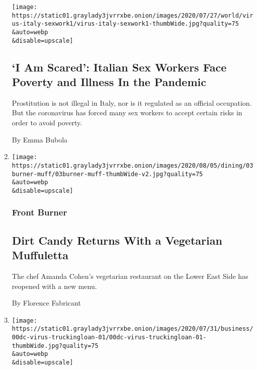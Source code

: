 \begin{enumerate}
  \texttt{[image: https://static01.graylady3jvrrxbe.onion/images/2020/07/27/world/virus-italy-sexwork1/virus-italy-sexwork1-thumbWide.jpg?quality=75\\\&auto=webp\\\&disable=upscale]}

  \hypertarget{i-am-scared-italian-sex-workers-face-poverty-and-illness-in-the-pandemic}{%
  \subsection{`I Am Scared': Italian Sex Workers Face Poverty and
  Illness In the
  Pandemic}\label{i-am-scared-italian-sex-workers-face-poverty-and-illness-in-the-pandemic}}

  Prostitution is not illegal in Italy, nor is it regulated as an
  official occupation. But the coronavirus has forced many sex workers
  to accept certain risks in order to avoid poverty.

  By Emma Bubola
\item
  \href{/2020/08/03/dining/dirt-candy-vegetarian-muffuletta.html}{}

  \texttt{[image: https://static01.graylady3jvrrxbe.onion/images/2020/08/05/dining/03burner-muff/03burner-muff-thumbWide-v2.jpg?quality=75\\\&auto=webp\\\&disable=upscale]}

  \hypertarget{front-burner}{%
  \subsubsection{Front Burner}\label{front-burner}}

  \hypertarget{dirt-candy-returns-with-a-vegetarian-muffuletta}{%
  \subsection{Dirt Candy Returns With a Vegetarian
  Muffuletta}\label{dirt-candy-returns-with-a-vegetarian-muffuletta}}

  The chef Amanda Cohen's vegetarian restaurant on the Lower East Side
  has reopened with a new menu.

  By Florence Fabricant
\item
  \href{/2020/08/03/us/politics/yrc-coronavirus-relief-funds.html}{}

  \texttt{[image: https://static01.graylady3jvrrxbe.onion/images/2020/07/31/business/00dc-virus-truckingloan-01/00dc-virus-truckingloan-01-thumbWide.jpg?quality=75\\\&auto=webp\\\&disable=upscale]}

  \hypertarget{rescue-of-troubled-trucking-company-with-white-house-ties-draws-scrutiny}{%
}
\end{enumerate}

